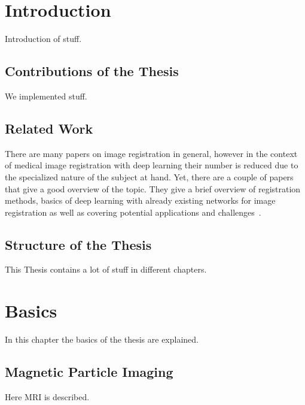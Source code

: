 \documentclass[english,version-2022-01]{uzl-thesis} %
\begin{document}

\chapter{Introduction}
Introduction of stuff.

\section{Contributions of the Thesis}
We implemented stuff.

\section{Related Work}
There are many papers on image registration in general, however in the context of medical image registration with deep learning their number is reduced due to the specialized nature of the subject at hand. Yet, there are a couple of papers that give a good overview of the topic.
They give a brief overview of registration methods, basics of deep learning with already existing networks for image registration as well as covering potential applications and challenges~\cite{Chen2020,Haskins2020,Fu2020,Zou2022,Chen2023}.


\section{Structure of the Thesis}
This Thesis contains a lot of stuff in different chapters.


\chapter{Basics}
In this chapter the basics of the thesis are explained.

\section{Magnetic Particle Imaging}
Here MRI is described. %
\end{document}

